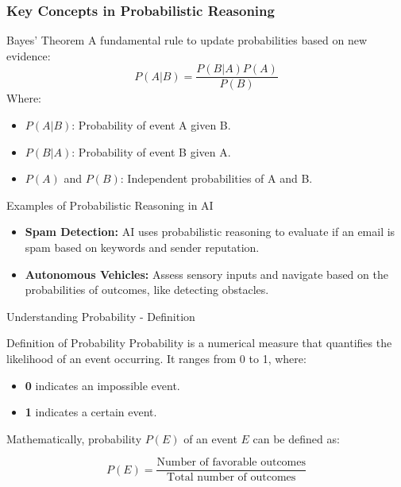 \documentclass[aspectratio=169]{beamer}
\begin{document}
\begin{frame}[fragile]
    \frametitle{Key Concepts in Probabilistic Reasoning}
    \begin{block}{Bayes' Theorem}
        A fundamental rule to update probabilities based on new evidence:
        \begin{equation}
            P(A | B) = \frac{P(B | A) P(A)}{P(B)}
        \end{equation}
        Where:
        \begin{itemize}
            \item $P(A | B)$: Probability of event A given B.
            \item $P(B | A)$: Probability of event B given A.
            \item $P(A)$ and $P(B)$: Independent probabilities of A and B.
        \end{itemize}
    \end{block}

    \begin{block}{Examples of Probabilistic Reasoning in AI}
        \begin{itemize}
            \item \textbf{Spam Detection:} AI uses probabilistic reasoning to evaluate if an email is spam based on keywords and sender reputation.
            \item \textbf{Autonomous Vehicles:} Assess sensory inputs and navigate based on the probabilities of outcomes, like detecting obstacles.
        \end{itemize}
    \end{block}
\end{frame}

\begin{frame}[fragile]{Understanding Probability - Definition}
    \begin{block}{Definition of Probability}
        Probability is a numerical measure that quantifies the likelihood of an event occurring. It ranges from 0 to 1, where:
        \begin{itemize}
            \item \textbf{0} indicates an impossible event.
            \item \textbf{1} indicates a certain event.
        \end{itemize}
    \end{block}
    
    Mathematically, probability \( P(E) \) of an event \( E \) can be defined as:
    
    \begin{equation}
        P(E) = \frac{\text{Number of favorable outcomes}}{\text{Total number of outcomes}}
    \end{equation}
\end{frame}
\end{document}
